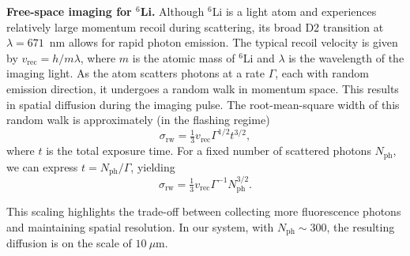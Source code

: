 \textbf{Free-space imaging for ${}^6$Li.}  
Although ${}^6$Li is a light atom and experiences relatively large momentum recoil during scattering, its broad D2 transition at $\lambda = 671$~nm allows for rapid photon emission. The typical recoil velocity is given by $v_\mathrm{rec} = {h}/{m \lambda}$, where $m$ is the atomic mass of ${}^6$Li and $\lambda$ is the wavelength of the imaging light. As the atom scatters photons at a rate $\Gamma$, each with random emission direction, it undergoes a random walk in momentum space. This results in spatial diffusion during the imaging pulse. The root-mean-square width of this random walk is approximately \cite{kruip_design_2024} (in the flashing regime)
\begin{equation}
	\sigma_\mathrm{rw} = \tfrac{1}{3} v_\mathrm{rec} \Gamma^{1/2} t^{3/2},
	\label{eq:sigmarw}
\end{equation}
where $t$ is the total exposure time. For a fixed number of scattered photons $N_\mathrm{ph}$, we can express $t = N_\mathrm{ph} / \Gamma$, yielding
\begin{equation}
	\sigma_\mathrm{rw} = \tfrac{1}{3} v_\mathrm{rec} \Gamma^{-1} N_\mathrm{ph}^{3/2}.
\end{equation}

This scaling highlights the trade-off between collecting more fluorescence photons and maintaining spatial resolution. In our system, with $N_\mathrm{ph} \sim 300$, the resulting diffusion is on the scale of $10~\mu$m.


